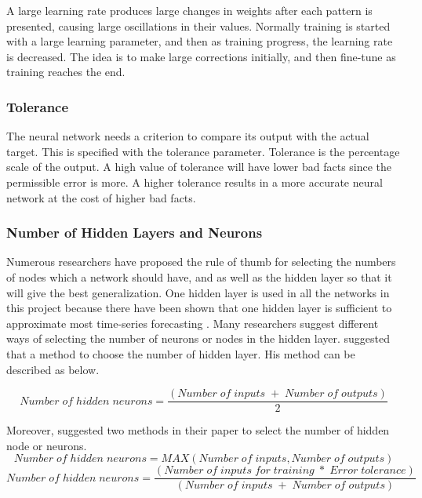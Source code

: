 A large learning rate produces large changes in weights after each pattern is presented, causing large oscillations in their values. Normally training is started with a large learning parameter, and then as training progress, the learning rate is decreased. The idea is to make large corrections initially, and then fine-tune as training reaches the end.

\subsubsection{Tolerance}
The neural network needs a criterion to compare its output with the actual target. This is specified with the tolerance parameter. Tolerance is the percentage scale of the output. A high value of tolerance will have lower bad facts since the permissible error is more. A higher tolerance results in a more accurate neural network at the cost of higher bad facts. 

\subsubsection{Number of Hidden Layers and Neurons} 
Numerous researchers have proposed the rule of thumb for   selecting  the numbers of nodes which a network should have, and as well as the hidden layer so that it will give the best generalization. One hidden layer is used in all the networks in this project because there  have been shown that  one hidden layer is sufficient to approximate most time-series  forecasting \cite{baestaens:1995, pandya:1995}. Many researchers suggest different ways of selecting the number of neurons or nodes in the hidden layer.  suggested that a method to choose the number of hidden layer. His method can be described as below.

\begin{equation*}
	Number\; of\; hidden\; neurons  = \frac {(Number\; of\; inputs\; +\; Number\; of\; outputs)}{2}
\end{equation*}

Moreover,  suggested  two methods in their paper to select the number of hidden node or neurons.     
\begin{equation*}
	Number\; of\; hidden\; neurons = MAX(Number \; of \; inputs, Number\; of\; outputs) 
\end{equation*}
\begin{equation*}
	Number\; of\; hidden\; neurons = \frac{(Number\;  of\; inputs\; for\; training \;\ast \;  Error\; tolerance )}{(Number\; of\; inputs\; +\; Number\; of\; outputs)}
\end{equation*}

